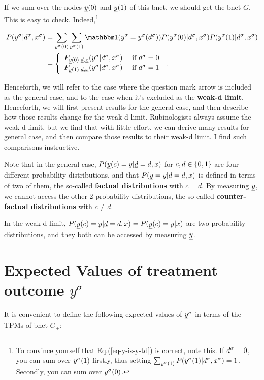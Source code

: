 If we sum over the
nodes $\rvy(0)$ and $\rvy(1)$
of this bnet, we should
get the bnet $G$.
This is easy to check. Indeed,\footnote{To
convince yourself that Eq.(\ref{eq-y-is-y-td})
 is correct, note this.
If $d^\sigma=0$, you can sum over
$y^\sigma(1)$ firstly, thus
setting $\sum_{y^\sigma(1)}P(y^\sigma(1)|d^\sigma, x^\sigma)=1$.
Secondly, you can sum over $y^\sigma(0)$.}

\begin{align}
P(y^\s|d^\s, x^\s)
&=
\sum_{y^\s(0)}
\sum_{y^\s(1)}
\indi(y^\s= y^\s(d^\s))
P(y^\s(0)|d^\s, x^\s)
P(y^\s(1)|d^\s, x^\s)
\\
&=
\left\{
\begin{array}{ll}
P_{\rvy(0)|\rvd, \rvx}(
y^\s|d^\s, x^\s)&\text{ if }
d^\s=0
\\
P_{\rvy(1)|\rvd, \rvx}(
y^\s|d^\s, x^\s)&\text{ if }
d^\s=1
\end{array}
\right.
\;.
\label{eq-y-is-y-td}
\end{align}

Henceforth,
we will refer
to the case where
the question mark
arrow is included as
the general case,
and to the case when it's excluded
as the {\bf weak-d limit}.
Henceforth, we
will first present
results for the
general case,
and then
describe how  those
results
change for the
weak-d limit.
Rubinologists
always assume the
weak-d limit, but
we find that
with little effort,
we can derive
many results for
general case, and
then compare those
results
to their weak-d limit.
I find such
comparisons instructive.

Note that in the general case,
$P(\rvy(c)=y|\rvd=d, x)$
for $c, d\in \{0,1\}$
are four
different probability
distributions,
and that
$P(\rvy=y|d=d,x)$
is defined in terms
of two of them, the
so-called {\bf factual
distributions} with $c=d$.
By measuring $\rvy$,
we cannot access the other
2 probability distributions,
the so-called {\bf counter-factual
distributions}
with $c\neq d$.

In the weak-d limit,
$P(\rvy(c)=y|\rvd=d, x
)=P(\rvy(c)=y|x)$ are
two probability
distributions,
and they both
can be accessed
by measuring $\rvy$.





\section{Expected Values of
 treatment outcome $y^\sigma$}

It is convenient
to define
the following
expected values of
$\rvy^\s$
in terms of the TPMs of
bnet $G_{+}$:

